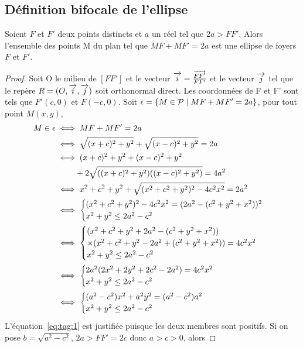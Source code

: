 \subsection{Définition bifocale de l'ellipse}
\begin{prop}
  \label{prop:bifellipse}
  Soient $F$ et $F'$ deux points distincts et $a$ un réel tel que $2a>FF'$. Alors l'ensemble des points M du plan tel que $MF+MF'=2a$ est une ellipse de foyers $F$ et $F'$.
\end{prop}
\begin{proof}
  Soit O le milieu de $[FF']$ et le vecteur $\overrightarrow{i}=\frac{\overrightarrow{FF'}}{FF'}$ et le vecteur $\overrightarrow{j}$ tel que le repère $R=(O,\overrightarrow{i},\overrightarrow{j})$ soit orthonormal direct. Les coordonnées de F et F' sont tels que $F'(c,0)$ et $F(-c,0)$. Soit $\epsilon=\left\{M \in \mathcal{P}\mathrel{}\middle|\mathrel{}MF+MF'=2a\right\}$, pour tout point $M(x,y)$, 
  \begin{align}
    M \in \epsilon & \iff MF+MF'=2a \\
    & \iff \sqrt{(x+c)^2+y^2} + \sqrt{(x-c)^2+y^2}=2a \\
    & \iff (x+c)^2+y^2+(x-c)^2+y^2 \notag \\
    & \phantom{\iff} + 2\sqrt{((x+c)^2+y^2)((x-c)^2+y^2)}=4a^2 \label{eq:tag:1}\\
    & \iff x^2+c^2+y^2+\sqrt{(x^2+c^2+y^2)^2-4c^2x^2}=2a^2\\
    & \iff \begin{cases} (x^2+c^2+y^2)^2-4c^2x^2 = (2a^2-(c^2+y^2+x^2))^2 \\ x^2+y^2 \leq 2a^2 -c^2\\\end{cases}\\
    & \iff \begin{cases} (x^2+c^2+y^2 + 2a^2-(c^2+y^2+x^2)) \\ \times (x^2+c^2+y^2 - 2a^2+(c^2+y^2+x^2))=4c^2x^2  \\ x^2+y^2 \leq 2a^2 -c^2\end{cases}\\
    & \iff \begin{cases} 2a^2(2x^2+2y^2+2c^2-2a^2)=4c^2x^2  \\ x^2+y^2 \leq 2a^2 -c^2\end{cases}\\
    & \iff \begin{cases} (a^2-c^2)x^2 +a^2y^2=(a^2-c^2)a^2  \\ x^2+y^2 \leq 2a^2 -c^2\end{cases}
  \end{align}
L'équation~\eqref{eq:tag:1} est justifiée puisque les deux membres sont positifs. Si on  pose $b=\sqrt{a^2-c^2}$, $2a>FF'=2c$ donc $a>c>0$, alors

\end{proof}
